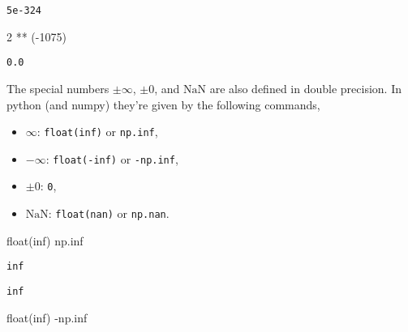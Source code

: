 \documentclass[
  letterpaper,
  DIV=11,
  numbers=noendperiod]{scrreprt}
\newenvironment{Shaded}{\begin{snugshade}}{\end{snugshade}}
\newcommand{\BuiltInTok}[1]{\textcolor[rgb]{0.00,0.23,0.31}{#1}}
\newcommand{\DecValTok}[1]{\textcolor[rgb]{0.68,0.00,0.00}{#1}}
\newcommand{\NormalTok}[1]{\textcolor[rgb]{0.00,0.23,0.31}{#1}}
\newcommand{\OperatorTok}[1]{\textcolor[rgb]{0.37,0.37,0.37}{#1}}
\newcommand{\StringTok}[1]{\textcolor[rgb]{0.13,0.47,0.30}{#1}}
\providecommand{\tightlist}{%
  \setlength{\itemsep}{0pt}\setlength{\parskip}{0pt}}\usepackage{longtable,booktabs,array}
\begin{document}
\begin{verbatim}
5e-324
\end{verbatim}

\begin{Shaded}
\begin{Highlighting}[]
\DecValTok{2} \OperatorTok{**}\NormalTok{ (}\OperatorTok{{-}}\DecValTok{1075}\NormalTok{)}
\end{Highlighting}
\end{Shaded}

\begin{verbatim}
0.0
\end{verbatim}

The special numbers \(\pm \infty\), \(\pm 0\), and \(\text{NaN}\) are
also defined in double precision. In python (and numpy) they're given by
the following commands,

\begin{itemize}
\tightlist
\item
  \(\infty\): \texttt{float(\textquotesingle{}inf\textquotesingle{})} or
  \texttt{np.inf},
\item
  \(-\infty\): \texttt{float(\textquotesingle{}-inf\textquotesingle{})}
  or \texttt{-np.inf},
\item
  \(\pm 0\): \texttt{0},
\item
  \(\text{NaN}\):
  \texttt{float(\textquotesingle{}nan\textquotesingle{})} or
  \texttt{np.nan}.
\end{itemize}

\begin{Shaded}
\begin{Highlighting}[]
\BuiltInTok{float}\NormalTok{(}\StringTok{\textquotesingle{}inf\textquotesingle{}}\NormalTok{)}
\NormalTok{np.inf}
\end{Highlighting}
\end{Shaded}

\begin{verbatim}
inf
\end{verbatim}

\begin{verbatim}
inf
\end{verbatim}

\begin{Shaded}
\begin{Highlighting}[]
\BuiltInTok{float}\NormalTok{(}\StringTok{\textquotesingle{}{-}inf\textquotesingle{}}\NormalTok{)}
\OperatorTok{{-}}\NormalTok{np.inf}
\end{Highlighting}
\end{Shaded}
\end{document}
